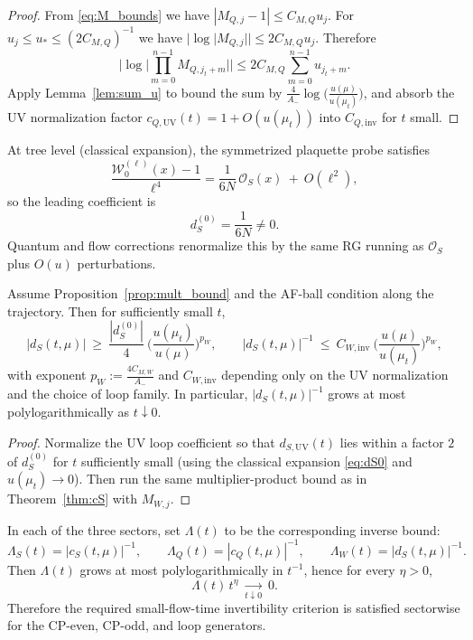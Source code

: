 \begin{proof}
From \eqref{eq:M_bounds} we have $|M_{Q,j}-1|\le C_{M,Q}u_j$.
For $u_j\le u_\ast\le (2C_{M,Q})^{-1}$ we have $|\log|M_{Q,j}||\le 2C_{M,Q}u_j$.
Therefore
\[
\Big|\log\Big|\prod_{m=0}^{n-1} M_{Q,j_t+m}\Big|\Big|
\le 2C_{M,Q}\sum_{m=0}^{n-1} u_{j_t+m}.
\]
Apply Lemma~\ref{lem:sum_u} to bound the sum by $\frac{4}{A_-}\log\!\big(\frac{u(\mu)}{u(\mu_t)}\big)$, and absorb the UV normalization factor $c_{Q,\mathrm{UV}}(t)=1+O(u(\mu_t))$ into $C_{Q,\mathrm{inv}}$ for $t$ small.
\end{proof}


At tree level (classical expansion), the symmetrized plaquette probe satisfies
\begin{equation}\label{eq:dS0}
\frac{\mathcal W^{(\ell)}_0(x)-1}{\ell^4}
=\frac{1}{6N}\,\mathcal O_S(x)\ +\ O(\ell^2),
\end{equation}
so the leading coefficient is
\[
d_S^{(0)}=\frac{1}{6N}\neq 0.
\]
Quantum and flow corrections renormalize this by the same RG running as $\mathcal O_S$ plus $O(u)$ perturbations.

\begin{theorem}\label{thm:dS}
Assume Proposition~\ref{prop:mult_bound} and the AF-ball condition along the trajectory.
Then for sufficiently small $t$,
\[
|d_S(t,\mu)|\ \ge\ \frac{|d_S^{(0)}|}{4}\ \Big(\frac{u(\mu_t)}{u(\mu)}\Big)^{p_W},
\qquad
|d_S(t,\mu)|^{-1}\ \le\ C_{W,\mathrm{inv}}\ \Big(\frac{u(\mu)}{u(\mu_t)}\Big)^{p_W},
\]
with exponent $p_W:=\frac{4C_{M,W}}{A_-}$ and $C_{W,\mathrm{inv}}$ depending only on the UV normalization and the choice of loop family.
In particular, $|d_S(t,\mu)|^{-1}$ grows at most polylogarithmically as $t\downarrow 0$.
\end{theorem}

\begin{proof}
Normalize the UV loop coefficient so that $d_{S,\mathrm{UV}}(t)$ lies within a factor $2$ of $d_S^{(0)}$ for $t$ sufficiently small
(using the classical expansion \eqref{eq:dS0} and $u(\mu_t)\to 0$).
Then run the same multiplier-product bound as in Theorem~\ref{thm:cS} with $M_{W,j}$.
\end{proof}

\begin{corollary}\label{cor:Lambda}
In each of the three sectors, set $\Lambda(t)$ to be the corresponding inverse bound:
\[
\Lambda_S(t)=|c_S(t,\mu)|^{-1},\qquad
\Lambda_Q(t)=|c_Q(t,\mu)|^{-1},\qquad
\Lambda_W(t)=|d_S(t,\mu)|^{-1}.
\]
Then $\Lambda(t)$ grows at most polylogarithmically in $t^{-1}$, hence for every $\eta>0$,
\[
\Lambda(t)\,t^\eta\ \xrightarrow[t\downarrow 0]{}\ 0.
\]
Therefore the required small-flow-time invertibility criterion is satisfied sectorwise for the CP-even, CP-odd, and loop generators.
\end{corollary}

